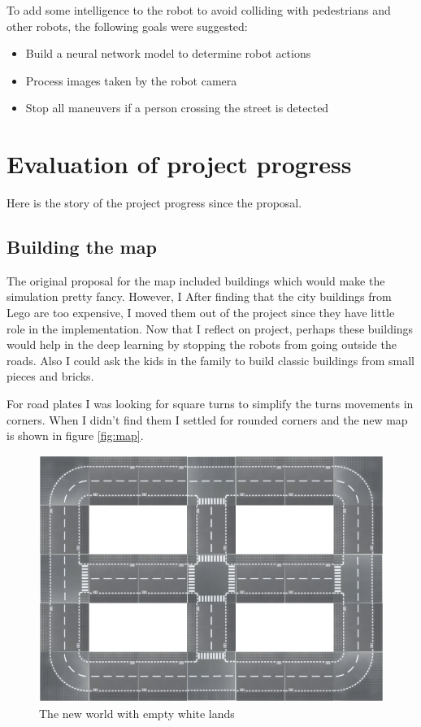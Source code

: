 \documentclass[12pt,a4paper]{article}
\begin{document}
To add some intelligence to the robot to avoid colliding with pedestrians and other robots,  the following goals were suggested:

\begin{itemize}
\item Build a neural network model to determine robot actions
\item Process images taken by the robot camera 
\item Stop all maneuvers if a person crossing the street is detected
\end{itemize}

\section{Evaluation of project progress}
Here is the story of the project progress since the proposal. 
\subsection{Building the map}
The original proposal for the map included buildings which would make the simulation pretty fancy. However, I After finding that the city buildings from Lego are too expensive, I moved them out of the project since they have little role in the implementation. Now that I reflect on project, perhaps these buildings would help in the deep learning by stopping the robots from going outside the roads. Also I could ask the kids in the family to build classic buildings from small pieces and bricks. 

For road plates I was looking for square turns to simplify the turns movements in corners. When I didn't find them I settled for rounded corners and the new map is shown in figure \ref{fig:map}.

\begin{figure}[H]
\center
\includegraphics[scale=0.5]{./map.png}
\caption{The new world with empty white lands} \label{fig:proposedMap} 
\end{figure}
\end{document}
